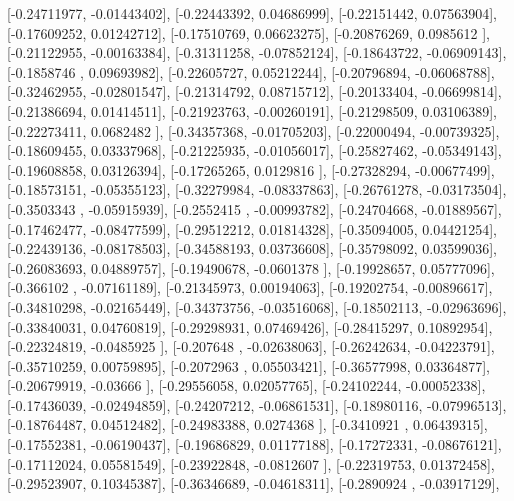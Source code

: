 \documentclass{article}
\begin{document}
       [-0.24711977, -0.01443402],
       [-0.22443392,  0.04686999],
       [-0.22151442,  0.07563904],
       [-0.17609252,  0.01242712],
       [-0.17510769,  0.06623275],
       [-0.20876269,  0.0985612 ],
       [-0.21122955, -0.00163384],
       [-0.31311258, -0.07852124],
       [-0.18643722, -0.06909143],
       [-0.1858746 ,  0.09693982],
       [-0.22605727,  0.05212244],
       [-0.20796894, -0.06068788],
       [-0.32462955, -0.02801547],
       [-0.21314792,  0.08715712],
       [-0.20133404, -0.06699814],
       [-0.21386694,  0.01414511],
       [-0.21923763, -0.00260191],
       [-0.21298509,  0.03106389],
       [-0.22273411,  0.0682482 ],
       [-0.34357368, -0.01705203],
       [-0.22000494, -0.00739325],
       [-0.18609455,  0.03337968],
       [-0.21225935, -0.01056017],
       [-0.25827462, -0.05349143],
       [-0.19608858,  0.03126394],
       [-0.17265265,  0.0129816 ],
       [-0.27328294, -0.00677499],
       [-0.18573151, -0.05355123],
       [-0.32279984, -0.08337863],
       [-0.26761278, -0.03173504],
       [-0.3503343 , -0.05915939],
       [-0.2552415 , -0.00993782],
       [-0.24704668, -0.01889567],
       [-0.17462477, -0.08477599],
       [-0.29512212,  0.01814328],
       [-0.35094005,  0.04421254],
       [-0.22439136, -0.08178503],
       [-0.34588193,  0.03736608],
       [-0.35798092,  0.03599036],
       [-0.26083693,  0.04889757],
       [-0.19490678, -0.0601378 ],
       [-0.19928657,  0.05777096],
       [-0.366102  , -0.07161189],
       [-0.21345973,  0.00194063],
       [-0.19202754, -0.00896617],
       [-0.34810298, -0.02165449],
       [-0.34373756, -0.03516068],
       [-0.18502113, -0.02963696],
       [-0.33840031,  0.04760819],
       [-0.29298931,  0.07469426],
       [-0.28415297,  0.10892954],
       [-0.22324819, -0.0485925 ],
       [-0.207648  , -0.02638063],
       [-0.26242634, -0.04223791],
       [-0.35710259,  0.00759895],
       [-0.2072963 ,  0.05503421],
       [-0.36577998,  0.03364877],
       [-0.20679919, -0.03666   ],
       [-0.29556058,  0.02057765],
       [-0.24102244, -0.00052338],
       [-0.17436039, -0.02494859],
       [-0.24207212, -0.06861531],
       [-0.18980116, -0.07996513],
       [-0.18764487,  0.04512482],
       [-0.24983388,  0.0274368 ],
       [-0.3410921 ,  0.06439315],
       [-0.17552381, -0.06190437],
       [-0.19686829,  0.01177188],
       [-0.17272331, -0.08676121],
       [-0.17112024,  0.05581549],
       [-0.23922848, -0.0812607 ],
       [-0.22319753,  0.01372458],
       [-0.29523907,  0.10345387],
       [-0.36346689, -0.04618311],
       [-0.2890924 , -0.03917129],
\end{document}
